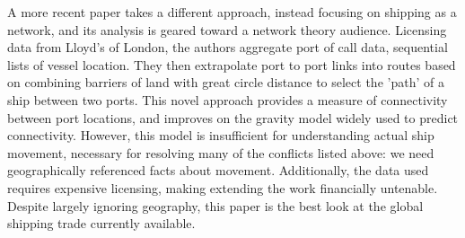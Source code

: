 
A more recent paper \citep{Kaluza2010} takes a different approach, instead focusing on shipping as a network, and its analysis is geared toward a network theory audience. Licensing data from Lloyd's of London, %
 the authors aggregate port of call data, sequential lists of vessel location. They then extrapolate port to port links into routes based on combining barriers of land with great circle distance to select the 'path' of a ship between two ports. This novel approach provides a measure of connectivity between port locations, and improves on the gravity model widely used to predict connectivity. %
However, this model is insufficient for understanding actual ship movement, necessary for resolving many of the conflicts listed above: we need geographically referenced facts about movement. Additionally, the data used requires expensive licensing, making extending the work financially untenable. Despite largely ignoring geography, this paper is the best look at the global shipping trade currently available.



